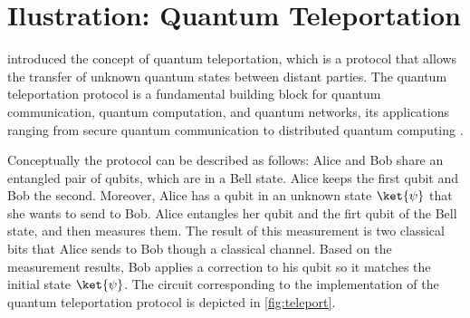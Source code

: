 

\section{Ilustration: Quantum Teleportation} \label{sec:teleport}

\cite{bennett1993teleporting} introduced the concept of quantum teleportation, which is a protocol that allows the transfer of   unknown quantum states between distant parties.  The quantum teleportation protocol is a fundamental building block for quantum communication, quantum computation, and quantum networks, its applications ranging
from secure quantum communication to distributed quantum computing \cite{briegel1998quantum,gottesman1999demonstrating,kimble2008quantum}. %

Conceptually the protocol can be described as follows: Alice and Bob share an entangled pair of qubits, which are in a Bell state. Alice keeps the first qubit and Bob the second. Moreover, Alice has a qubit in an unknown state $\ket{\psi}$ that she wants to send to Bob.  
 Alice entangles her qubit and the firt qubit of the Bell state, and then measures them. The result of this measurement is two classical bits that Alice sends to Bob though a classical channel. Based on the measurement results, Bob applies a correction to his qubit so it matches the initial state $\ket{\psi}$. 
The circuit corresponding to the implementation of the quantum teleportation protocol is depicted in \autoref{fig:teleport}. 

